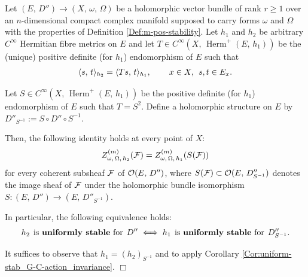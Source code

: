 \documentclass[12pt]{article}
\begin{document}
\begin{Cor}\label{Cor:uniform-stab_class-intrinsic} Let $(E,\,D'')\longrightarrow (X,\,\omega,\,\Omega)$ be a holomorphic vector bundle of rank $r\geq 1$ over an $n$-dimensional compact complex manifold supposed to carry forms $\omega$ and $\Omega$ with the properties of Definition \ref{Def:m-pos-stability}. Let $h_1$ and $h_2$ be arbitrary $C^\infty$ Hermitian fibre metrics on $E$ and let $T\in C^\infty(X,\,\operatorname{Herm}^{+}(E,\,h_1))$ be the (unique) positive definite (for $h_1$) endomorphism of $E$ such that \begin{eqnarray*}\langle s,\,t\rangle_{h_2} = \langle Ts,\,t\rangle_{h_1}, \hspace{5ex} x\in X, \hspace{1ex} s,t\in E_x.\end{eqnarray*}

  Let $S\in C^\infty(X,\,\operatorname{Herm}^{+}(E,\,h_1))$ be the positive definite (for $h_1$) endomorphism of $E$ such that $T=S^2$. Define a holomorphic structure on $E$ by $D''_{S^{-1}}:=S\circ D''\circ S^{-1}$.

  \vspace{1ex}

  Then, the following identity holds at every point of $X$: \begin{eqnarray}\label{eqn:Z-functions_equality_F-SF}Z^{(m)}_{\omega,\,\Omega,\,h_2}({\cal F}) = Z^{(m)}_{\omega,\,\Omega,\,h_1}(S({\cal F}))\end{eqnarray} for every coherent subsheaf ${\cal F}$ of ${\cal O}(E,\,D'')$, where $S({\cal F})\subset{\cal O}(E,\,D''_{S^{-1}})$ denotes the image sheaf of ${\cal F}$ under the holomorphic bundle isomorphism $S:(E,\,D'')\longrightarrow(E,\,D''_{S^{-1}})$.

In particular, the following equivalence holds: \begin{eqnarray*}\label{eqn:uniform-stab_class-intrinsic_equiv}h_2 \hspace{1ex} \mbox{is {\bf uniformly stable} for} \hspace{1ex} D'' \iff h_1 \hspace{1ex} \mbox{is {\bf uniformly stable} for} \hspace{1ex} D''_{S^{-1}}.\end{eqnarray*} 

\end{Cor}  

 It suffices to observe that $h_1 = (h_2)_{S^{-1}}$ and to apply Corollary \ref{Cor:uniform-stab_G-C-action_invariance}. \hfill $\Box$
\end{document}
